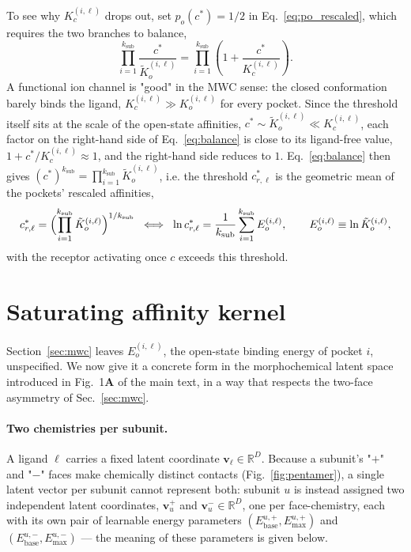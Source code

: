 \documentclass[aps,pre,superscriptaddress,floatfix,longbibliography]{revtex4-2}
\begin{document}
To see why $K_c^{(i,\ell)}$ drops out, set $p_o(c^*)=1/2$ in
Eq.~\eqref{eq:po_rescaled}, which requires the two branches to balance,
\begin{equation}
\prod_{i=1}^{k_\text{sub}} \frac{c^*}{\tilde K_o^{(i,\ell)}} = \prod_{i=1}^{k_\text{sub}} \left(1+\frac{c^*}{K_c^{(i,\ell)}}\right).
\label{eq:balance}
\end{equation}
A functional ion channel is "good" in the MWC sense: the closed conformation
barely binds the ligand, $K_c^{(i,\ell)} \gg K_o^{(i,\ell)}$ for every
pocket. Since the threshold itself sits at the scale of the open-state
affinities, $c^*\sim\tilde K_o^{(i,\ell)} \ll K_c^{(i,\ell)}$, each factor on
the right-hand side of Eq.~\eqref{eq:balance} is close to its ligand-free
value, $1+c^*/K_c^{(i,\ell)} \approx 1$, and the right-hand side reduces to
$1$. Eq.~\eqref{eq:balance} then gives $(c^*)^{k_\text{sub}} =
\prod_{i=1}^{k_\text{sub}}\tilde K_o^{(i,\ell)}$, i.e. the threshold
$c^*_{r,\ell}$ is the geometric mean of the pockets' rescaled affinities,
\begin{equation}
c^*_{r,\ell} = \Bigl(\prod_{i=1}^{k_\text{sub}} \tilde K_o^{(i,\ell)}\Bigr)^{1/k_\text{sub}}
\;\;\Longleftrightarrow\;\;
\ln c^*_{r,\ell} = \frac{1}{k_\text{sub}}\sum_{i=1}^{k_\text{sub}} E_o^{(i,\ell)},
\qquad E_o^{(i,\ell)} \equiv \ln\tilde K_o^{(i,\ell)},
\label{eq:ec50}
\end{equation}
with the receptor activating once $c$ exceeds this threshold.

\section{Saturating affinity kernel}
\label{sec:kernel}

Section~\ref{sec:mwc} leaves $E_o^{(i,\ell)}$, the open-state binding energy
of pocket $i$, unspecified. We now give it a concrete form in the
morphochemical latent space introduced in Fig.~1\textbf{A} of the main text,
in a way that respects the two-face asymmetry of Sec.~\ref{sec:mwc}.

\paragraph{Two chemistries per subunit.} A ligand $\ell$ carries a fixed
latent coordinate $\mathbf v_\ell\in\mathbb R^D$. Because a subunit's "$+$"
and "$-$" faces make chemically distinct contacts (Fig.~\ref{fig:pentamer}),
a single latent vector per subunit cannot represent both: subunit $u$ is
instead assigned two independent latent coordinates, $\mathbf v_u^+$ and
$\mathbf v_u^-\in\mathbb R^D$, one per face-chemistry, each with its own pair
of learnable energy parameters $(E_\text{base}^{u,+},E_\text{max}^{u,+})$ and
$(E_\text{base}^{u,-},E_\text{max}^{u,-})$ — the meaning of these parameters
is given below.
\end{document}
